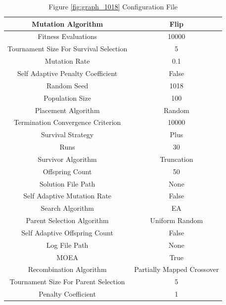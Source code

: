 \documentclass{standalone}
\begin{document}
\begin{table}[!htb]
	\centering
	\caption{Figure \ref{fig:graph_1018} Configuration File}
	\label{tab:graph_1018}
	\begin{tabular}{| c | c |}
		\hline
		Mutation Algorithm		& Flip		 \\
		\hline
		Fitness Evaluations		& 10000		 \\
		\hline
		Tournament Size For Survival Selection		& 5		 \\
		\hline
		Mutation Rate		& 0.1		 \\
		\hline
		Self Adaptive Penalty Coefficient		& False		 \\
		\hline
		Random Seed		& 1018		 \\
		\hline
		Population Size		& 100		 \\
		\hline
		Placement Algorithm		& Random		 \\
		\hline
		Termination Convergence Criterion		& 10000		 \\
		\hline
		Survival Strategy		& Plus		 \\
		\hline
		Runs		& 30		 \\
		\hline
		Survivor Algorithm		& Truncation		 \\
		\hline
		Offspring Count		& 50		 \\
		\hline
		Solution File Path		& None		 \\
		\hline
		Self Adaptive Mutation Rate		& False		 \\
		\hline
		Search Algorithm		& EA		 \\
		\hline
		Parent Selection Algorithm		& Uniform Random		 \\
		\hline
		Self Adaptive Offspring Count		& False		 \\
		\hline
		Log File Path		& None		 \\
		\hline
		MOEA		& True		 \\
		\hline
		Recombination Algorithm		& Partially Mapped Crossover		 \\
		\hline
		Tournament Size For Parent Selection		& 5		 \\
		\hline
		Penalty Coefficient		& 1		 \\
		\hline
	\end{tabular}
\end{table}
\end{document}
